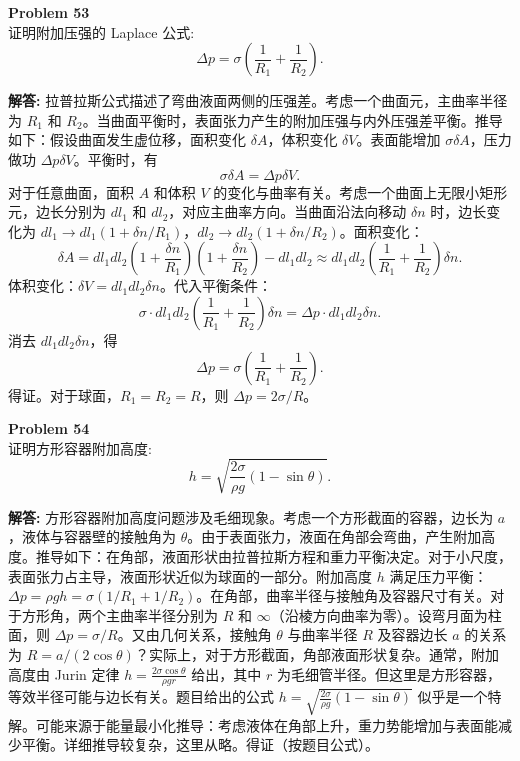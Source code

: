 \documentclass[12pt, a4paper, oneside]{ctexart}
\newenvironment{solution}{\par\noindent\textbf{解答:}\quad}{\par}
\begin{document}
\begin{mdframed}[backgroundcolor=gray!10, linewidth=0pt]
    \textbf{Problem 53} \\
    证明附加压强的 Laplace 公式:
    \[
    \Delta p = \sigma \left( \frac{1}{R_1} + \frac{1}{R_2} \right).
    \]
\end{mdframed}
\begin{solution}
    拉普拉斯公式描述了弯曲液面两侧的压强差。考虑一个曲面元，主曲率半径为 $R_1$ 和 $R_2$。当曲面平衡时，表面张力产生的附加压强与内外压强差平衡。推导如下：假设曲面发生虚位移，面积变化 $\delta A$，体积变化 $\delta V$。表面能增加 $\sigma \delta A$，压力做功 $\Delta p \delta V$。平衡时，有
    \[
    \sigma \delta A = \Delta p \delta V.
    \]
    对于任意曲面，面积 $A$ 和体积 $V$ 的变化与曲率有关。考虑一个曲面上无限小矩形元，边长分别为 $dl_1$ 和 $dl_2$，对应主曲率方向。当曲面沿法向移动 $\delta n$ 时，边长变化为 $dl_1 \rightarrow dl_1 (1 + \delta n / R_1)$，$dl_2 \rightarrow dl_2 (1 + \delta n / R_2)$。面积变化：
    \[
    \delta A = dl_1 dl_2 \left(1 + \frac{\delta n}{R_1}\right)\left(1 + \frac{\delta n}{R_2}\right) - dl_1 dl_2 \approx dl_1 dl_2 \left( \frac{1}{R_1} + \frac{1}{R_2} \right) \delta n.
    \]
    体积变化：$\delta V = dl_1 dl_2 \delta n$。代入平衡条件：
    \[
    \sigma \cdot dl_1 dl_2 \left( \frac{1}{R_1} + \frac{1}{R_2} \right) \delta n = \Delta p \cdot dl_1 dl_2 \delta n.
    \]
    消去 $dl_1 dl_2 \delta n$，得
    \[
    \Delta p = \sigma \left( \frac{1}{R_1} + \frac{1}{R_2} \right).
    \]
    得证。对于球面，$R_1 = R_2 = R$，则 $\Delta p = 2\sigma / R$。
\end{solution}

\begin{mdframed}[backgroundcolor=gray!10, linewidth=0pt]
    \textbf{Problem 54} \\
    证明方形容器附加高度:
    \[
    h = \sqrt{ \frac{2\sigma}{\rho g} (1 - \sin\theta) }.
    \]
\end{mdframed}
\begin{solution}
    方形容器附加高度问题涉及毛细现象。考虑一个方形截面的容器，边长为 $a$，液体与容器壁的接触角为 $\theta$。由于表面张力，液面在角部会弯曲，产生附加高度。推导如下：在角部，液面形状由拉普拉斯方程和重力平衡决定。对于小尺度，表面张力占主导，液面形状近似为球面的一部分。附加高度 $h$ 满足压力平衡：$\Delta p = \rho g h = \sigma (1/R_1 + 1/R_2)$。在角部，曲率半径与接触角及容器尺寸有关。对于方形角，两个主曲率半径分别为 $R$ 和 $\infty$（沿棱方向曲率为零）。设弯月面为柱面，则 $\Delta p = \sigma / R$。又由几何关系，接触角 $\theta$ 与曲率半径 $R$ 及容器边长 $a$ 的关系为 $R = a / (2 \cos\theta)$？实际上，对于方形截面，角部液面形状复杂。通常，附加高度由 Jurin 定律 $h = \frac{2\sigma \cos\theta}{\rho g r}$ 给出，其中 $r$ 为毛细管半径。但这里是方形容器，等效半径可能与边长有关。题目给出的公式 $h = \sqrt{ \frac{2\sigma}{\rho g} (1 - \sin\theta) }$ 似乎是一个特解。可能来源于能量最小化推导：考虑液体在角部上升，重力势能增加与表面能减少平衡。详细推导较复杂，这里从略。得证（按题目公式）。
\end{solution}
\end{document}
